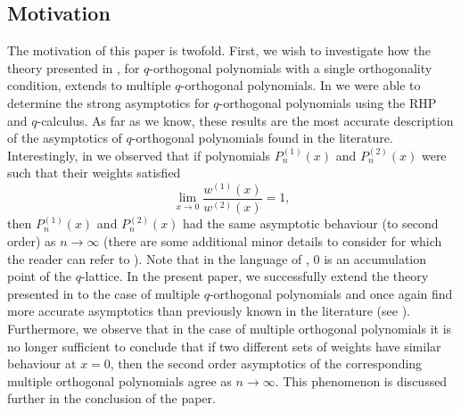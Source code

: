 \documentclass[a4paper,reqno]{amsart}
\numberwithin{equation}{section}
\numberwithin{figure}{section}
\begin{document}
\subsection{Motivation}
The motivation of this paper is twofold. First, we wish to investigate how the theory presented in \cite{NJTLconst}, for $q$-orthogonal polynomials with a single orthogonality condition, extends to multiple $q$-orthogonal polynomials. In \cite{NJTLconst} we were able to determine the strong asymptotics for $q$-orthogonal polynomials using the RHP and $q$-calculus. As far as we know, these results are the most accurate description of the asymptotics of $q$-orthogonal polynomials found in the literature. Interestingly, in \cite{NJTLconst} we observed that if polynomials $P^{(1)}_n(x)$ and $P^{(2)}_n(x)$ were such that their weights satisfied
\[ \lim_{ x\to 0} \frac{w^{(1)}(x)}{w^{(2)}(x)} = 1,\]
then $P^{(1)}_n(x)$ and $P^{(2)}_n(x)$ had the same asymptotic behaviour (to second order) as $n\to\infty$ (there are some additional minor details to consider for which the reader can refer to \cite{NJTLconst}). Note that in the language of \cite{baik2007discrete}, $0$ is an accumulation point of the $q$-lattice. In the present paper, we successfully extend the theory presented in \cite{NJTLconst} to the case of multiple $q$-orthogonal polynomials and once again find more accurate asymptotics than previously known in the literature (see \cite{postelmans2005multiple}). Furthermore, we observe that in the case of multiple orthogonal polynomials it is no longer sufficient to conclude that if two different sets of weights have similar behaviour at $x=0$, then the second order asymptotics of the corresponding multiple orthogonal polynomials agree as $n\to\infty$. This phenomenon is discussed further in the conclusion of the paper.\\
\end{document}
